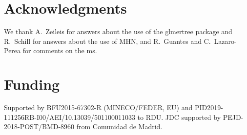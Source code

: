 \documentclass[a4paper,10pt]{article}
\newcommand{\idea}[1]{\textcolor{red}{#1}}
\begin{document}
  



\section{Acknowledgments}

We thank A.~Zeileis for answers about the use of the glmertree package and
R.~Schill for answers about the use of MHN, and R.~Guantes and C.~Lazaro-Perea
for comments on the ms.

\section{Funding}
Supported by BFU2015-67302-R (MINECO/FEDER, EU) and
PID2019-111256RB-I00/AEI/10.13039/501100011033 
to RDU. JDC supported by
PEJD-2018-POST/BMD-8960 from Comunidad de Madrid.
\end{document}
